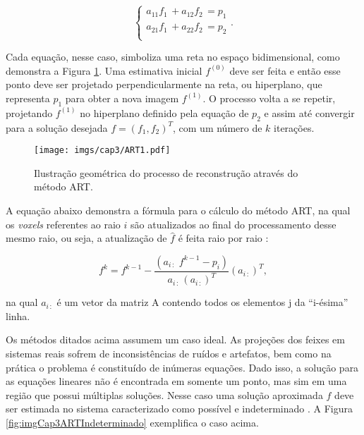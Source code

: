 {{\begin{equation}
\begin{cases}
a_{11}f_{1} \, + a_{12}f_{2} \, = p_{1} \\ 
a_{21}f_{1} \, + a_{22}f_{2} \, = p_{2} \\  
\end{cases}.
\label{eq:eqCap3ARTEquacoesLineares}
\end{equation}

Cada equação, nesse caso, simboliza uma reta no espaço bidimensional, como demonstra a Figura \ref{fig:imgCap3ART}. Uma estimativa inicial $f^{(0)}$ deve ser feita e então esse ponto deve ser projetado perpendicularmente na reta, ou hiperplano, que representa $p_{1}$ para obter a nova imagem $f^{(1)}$. O processo volta a se repetir, projetando $f^{(1)}$ no hiperplano definido pela equação de $p_{2}$ e assim até convergir para a solução desejada $f = (f_{1},f_{2})^{T}$, com um número de $k$ iterações.


\begin{figure}[h]
	\caption{Ilustração geométrica do processo de reconstrução através do método \acs{ART}.}
	\begin{center}
		\texttt{[image: imgs/cap3/ART1.pdf]}
	\end{center}
	\label{fig:imgCap3ART}
\end{figure} 

A equação abaixo demonstra a fórmula para o cálculo do método \acs{ART}, na qual os \textit{voxels} referentes ao raio $i$ são atualizados ao final do processamento desse mesmo raio, ou seja, a atualização de $\hat{f}$ é feita raio por raio \cite{buzug2008computed, levakhina2014three}:


\begin{equation}
f^{k} = f^{k-1} - \dfrac{(a_{i \, :} \,\, f^{k-1}- p_{i})}{a_{i\, :}\,(a_{i\, :})^{T}}   (a_{i\, :})^{T}   ,  
\label{eq:eqCap3ARTEquacao}
\end{equation}

\noindent na qual $a_{i \, :}$ é um vetor da matriz A contendo todos os elementos j da ``i-ésima'' linha. 


Os métodos ditados acima assumem um caso ideal. As projeções dos feixes em sistemas reais sofrem de inconsistências de ruídos e artefatos, bem como na prática o problema é constituído de inúmeras equações. Dado isso, a solução para as equações lineares não é encontrada em somente um ponto, mas sim em uma região que possui múltiplas soluções. Nesse caso uma solução aproximada $\hat{f}$ deve ser estimada no sistema caracterizado como possível e indeterminado \cite[p. 218]{buzug2008computed}. A Figura \ref{fig:imgCap3ARTIndeterminado} exemplifica o caso acima. 

}}
